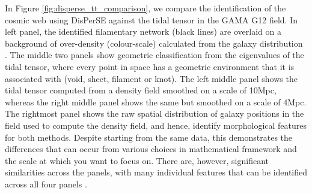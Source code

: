 In Figure \ref{fig:disperse_tt_comparison}, we compare the identification of the cosmic web using DisPerSE against the tidal tensor in the GAMA G12 field. In left panel, the identified filamentary network (black lines) are overlaid on a background of over-density (colour-scale) calculated from the galaxy distribution \citep[taken from][]{kraljic2018}. The middle two panels show geometric classification from the eigenvalues of the tidal tensor, where every point in space has a geometric environment that it is associated with (void, sheet, filament or knot). The left middle panel shows the tidal tensor computed from a density field smoothed on a scale of 10Mpc, whereas the right middle panel shows the same but smoothed on a scale of 4Mpc. The rightmost panel shows the raw spatial distribution of galaxy positions in the field used to compute the density field, and hence, identify morphological features for both methods. Despite starting from the same data, this demonstrates the differences that can occur from various choices in mathematical framework and the scale at which you want to focus on. There are, however, significant similarities across the panels, with many individual features that can be identified across all four panels \citep[also see Figure 4 in][]{libeskind2018}. 

